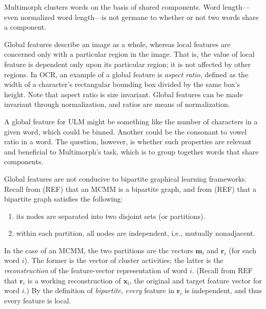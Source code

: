Multimorph clusters words on the basis of shared components. 
Word length---even normalized word length---is not %
germane to whether or not two words share a component. 


Global features describe an image as a whole, whereas local features are concerned
only with a particular region in the image. That is, the value of local feature is dependent
only upon its particular region; it is not affected by other regions. 
In OCR, an example of a global feature is \emph{aspect ratio}, defined 
as the width of a character's rectangular bounding box divided by the same 
box's height. Note that aspect ratio is size invariant. Global features 
can be made invariant 
through normalization, and ratios are means of normalization.

A global feature for ULM might be something like the number 
of characters in a given word, which could be binned. Another 
could be the consonant to vowel ratio in a word. The question, however, is 
whether such properties are relevant and beneficial to Multimorph's task,
which is to group together words that share components.


Global features are not conducive to bipartite graphical learning frameworks.
Recall from (REF) that an MCMM is a bipartite graph, and from (REF) that 
a bipartite graph satisfies the following:
\begin{enumerate}
\item its nodes are separated into two disjoint sets (or partitions).
\item within each partition, all nodes are independent, i.e., mutually 
nonadjacent.
\end{enumerate}
In the case of an MCMM, the two partitions are the vectors $\textbf{m}_{i}$
and $\textbf{r}_{i}$ (for each word $i$). The former is the vector of cluster activities; the latter
is the \emph{reconstruction} of the feature-vector representation of word $i$. (Recall from REF that $\textbf{r}_i$ is a working
reconstruction of $\textbf{x}_i$, the original and target feature vector for word $i$.)
By the definition of \emph{bipartite}, \emph{every} feature in $\textbf{r}_i$ is independent,
and thus every feature is local. 

